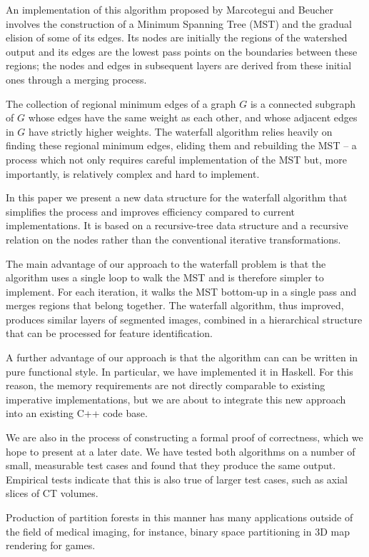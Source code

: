 \documentclass{ouclprgsc}
\begin{document}
An implementation of this algorithm proposed by Marcotegui and
Beucher~\cite{marcotegui} involves the construction of a Minimum
Spanning Tree (MST) and the gradual elision of some of its edges.  Its
nodes are initially the regions of the watershed output and its edges
are the lowest pass points on the boundaries between these regions;
the nodes and edges in subsequent layers are derived from these
initial ones through a merging process.

The collection of regional minimum edges of a graph $G$ is a connected
subgraph of $G$ whose edges have the same weight as each other, and
whose adjacent edges in $G$ have strictly higher weights. The
waterfall algorithm relies heavily on finding these regional minimum
edges, eliding them and rebuilding the MST -- a process which not only
requires careful implementation of the MST but, more importantly, is
relatively complex and hard to implement.

In this paper we present a new data structure for the waterfall
algorithm that simplifies the process and improves efficiency compared
to current implementations. It is based on a recursive-tree data
structure and a recursive relation on the nodes rather than the
conventional iterative transformations.

The main advantage of our approach to the waterfall problem is that
the algorithm uses a single loop to walk the MST and is therefore
simpler to implement. For each iteration, it walks the MST bottom-up
in a single pass and merges regions that belong together. The
waterfall algorithm, thus improved, produces similar layers of
segmented images, combined in a hierarchical structure that can be
processed for feature identification.

A further advantage of our approach is that the algorithm can can be
written in pure functional style. In particular, we have implemented
it in Haskell. For this reason, the memory requirements are not
directly comparable to existing imperative implementations, but we are
about to integrate this new approach into an existing C++ code base.

We are also in the process of constructing a formal proof of
correctness, which we hope to present at a later date. We have tested
both algorithms on a number of small, measurable test cases and found
that they produce the same output. Empirical tests indicate that this
is also true of larger test cases, such as axial slices of CT volumes.

Production of partition forests in this manner has many applications
outside of the field of medical imaging, for instance, binary space
partitioning in 3D map rendering for games.
\end{document}
